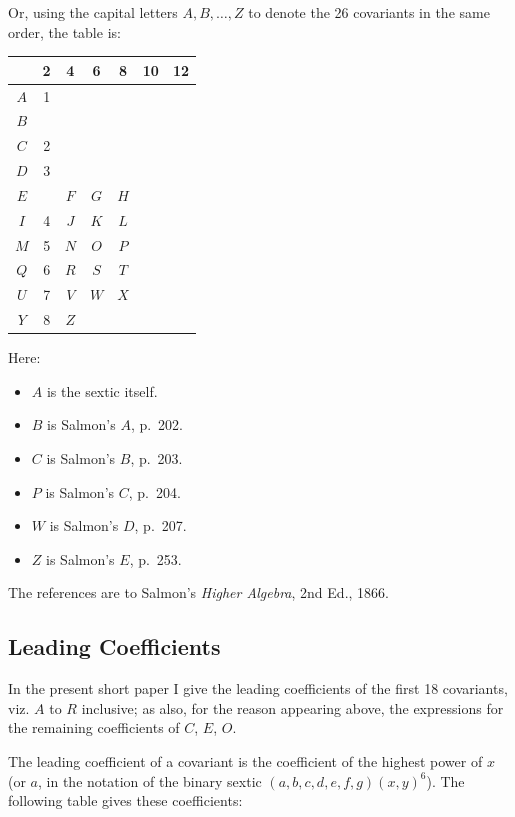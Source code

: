 \documentclass[11pt,a4paper]{book}
\begin{document}
Or, using the capital letters $A, B, \dots, Z$ to denote the 26 covariants in the same order, the table is:

\begin{center}
\begin{tabular}{c|cccccc}
\toprule
 & 2 & 4 & 6 & 8 & 10 & 12 \\
\midrule
$A$ & 1 & & & & & \\
$B$ & & & & & & \\
$C$ & 2 & & & & & \\
$D$ & 3 & & & & & \\
$E$ & & $F$ & $G$ & $H$ & & \\
$I$ & 4 & $J$ & $K$ & $L$ & & \\
$M$ & 5 & $N$ & $O$ & $P$ & & \\
$Q$ & 6 & $R$ & $S$ & $T$ & & \\
$U$ & 7 & $V$ & $W$ & $X$ & & \\
$Y$ & 8 & $Z$ & & & & \\
\bottomrule
\end{tabular}
\end{center}

Here:
\begin{itemize}[noitemsep]
\item $A$ is the sextic itself.
\item $B$ is Salmon's $A$, p.~202.
\item $C$ is Salmon's $B$, p.~203.
\item $P$ is Salmon's $C$, p.~204.
\item $W$ is Salmon's $D$, p.~207.
\item $Z$ is Salmon's $E$, p.~253.
\end{itemize}
The references are to Salmon's \textit{Higher Algebra}, 2nd Ed., 1866.

\subsection*{Leading Coefficients}

In the present short paper I give the leading coefficients of the first 18 covariants, viz. $A$ to $R$ inclusive; as also, for the reason appearing above, the expressions for the remaining coefficients of $C$, $E$, $O$.

The leading coefficient of a covariant is the coefficient of the highest power of $x$ (or $a$, in the notation of the binary sextic $(a, b, c, d, e, f, g)(x, y)^6$). The following table gives these coefficients:
\end{document}
